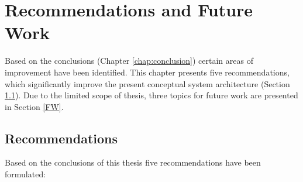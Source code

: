 
\chapter{Recommendations and Future Work}
\label{chap:futureResearch}
Based on the conclusions (Chapter \ref{chap:conclusion}) certain areas of improvement have been identified. This chapter presents five recommendations, which significantly improve the present conceptual system architecture (Section \ref{recommend}). Due to the limited scope of thesis, three topics for future work are presented in Section \ref{FW}.

\section{Recommendations}
\label{recommend}
Based on the conclusions of this thesis five recommendations have been formulated: 

